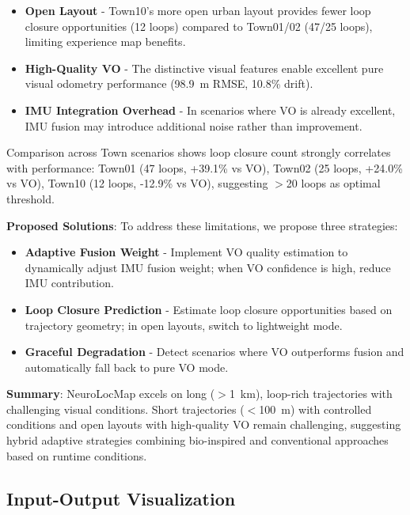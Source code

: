 \begin{itemize}
    \item \textbf{Open Layout} - Town10's more open urban layout provides fewer loop closure op\-por\-tu\-ni\-ties (12 loops) compared to Town01/02 (47/25 loops), limiting experience map benefits.
    
    \item \textbf{High-Quality VO} - The distinctive visual features enable excellent pure visual odometry per\-for\-mance (98.9~m RMSE, 10.8\% drift).
    
    \item \textbf{IMU Integration Overhead} - In scenarios where VO is already excellent, IMU fusion may introduce additional noise rather than improvement.
\end{itemize}

Comparison across Town scenarios shows loop closure count strongly correlates with per\-for\-mance: Town01 (47 loops, +39.1\% vs VO), Town02 (25 loops, +24.0\% vs VO), Town10 (12 loops, -12.9\% vs VO), suggesting $>$20 loops as optimal threshold.

\textbf{Proposed Solutions}: To address these limitations, we propose three strategies:

\begin{itemize}
    \item \textbf{Adaptive Fusion Weight} - Implement VO quality estimation to dynamically adjust IMU fusion weight; when VO confidence is high, reduce IMU con\-tri\-bu\-tion.
    
    \item \textbf{Loop Closure Prediction} - Estimate loop closure op\-por\-tu\-ni\-ties based on trajectory geometry; in open layouts, switch to lightweight mode.
    
    \item \textbf{Graceful Degradation} - Detect scenarios where VO outperforms fusion and automatically fall back to pure VO mode.
\end{itemize}

\textbf{Summary}: NeuroLocMap excels on long ($>$1~km), loop-rich trajectories with challenging visual conditions. Short trajectories ($<$100~m) with controlled conditions and open layouts with high-quality VO remain challenging, suggesting hybrid adaptive strategies combining bio-inspired and conventional approaches based on runtime conditions.

\subsection{Input-Output Visualization}

